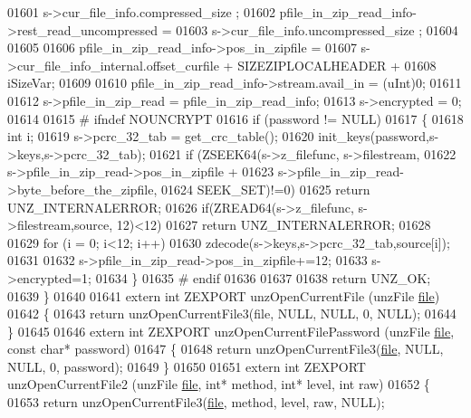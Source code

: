 \begin{DoxyCode}
01601             s->cur\_file\_info.compressed\_size ;
01602     pfile\_in\_zip\_read\_info->rest\_read\_uncompressed =
01603             s->cur\_file\_info.uncompressed\_size ;
01604 
01605 
01606     pfile\_in\_zip\_read\_info->pos\_in\_zipfile =
01607             s->cur\_file\_info\_internal.offset\_curfile + SIZEZIPLOCALHEADER +
01608               iSizeVar;
01609 
01610     pfile\_in\_zip\_read\_info->stream.avail\_in = (uInt)0;
01611 
01612     s->pfile\_in\_zip\_read = pfile\_in\_zip\_read\_info;
01613                 s->encrypted = 0;
01614 
01615 \textcolor{preprocessor}{#    ifndef NOUNCRYPT}
01616     \textcolor{keywordflow}{if} (password != NULL)
01617     \{
01618         \textcolor{keywordtype}{int} i;
01619         s->pcrc\_32\_tab = get\_crc\_table();
01620         init\_keys(password,s->keys,s->pcrc\_32\_tab);
01621         \textcolor{keywordflow}{if} (ZSEEK64(s->z\_filefunc, s->filestream,
01622                   s->pfile\_in\_zip\_read->pos\_in\_zipfile +
01623                      s->pfile\_in\_zip\_read->byte\_before\_the\_zipfile,
01624                   SEEK\_SET)!=0)
01625             \textcolor{keywordflow}{return} UNZ\_INTERNALERROR;
01626         \textcolor{keywordflow}{if}(ZREAD64(s->z\_filefunc, s->filestream,source, 12)<12)
01627             \textcolor{keywordflow}{return} UNZ\_INTERNALERROR;
01628 
01629         \textcolor{keywordflow}{for} (i = 0; i<12; i++)
01630             zdecode(s->keys,s->pcrc\_32\_tab,source[i]);
01631 
01632         s->pfile\_in\_zip\_read->pos\_in\_zipfile+=12;
01633         s->encrypted=1;
01634     \}
01635 \textcolor{preprocessor}{#    endif}
01636 
01637 
01638     \textcolor{keywordflow}{return} UNZ\_OK;
01639 \}
01640 
01641 \textcolor{keyword}{extern} \textcolor{keywordtype}{int} ZEXPORT unzOpenCurrentFile (unzFile \hyperlink{structfile}{file})
01642 \{
01643     \textcolor{keywordflow}{return} unzOpenCurrentFile3(file, NULL, NULL, 0, NULL);
01644 \}
01645 
01646 \textcolor{keyword}{extern} \textcolor{keywordtype}{int} ZEXPORT unzOpenCurrentFilePassword (unzFile \hyperlink{structfile}{file}, \textcolor{keyword}{const} \textcolor{keywordtype}{char}*  password)
01647 \{
01648     \textcolor{keywordflow}{return} unzOpenCurrentFile3(\hyperlink{structfile}{file}, NULL, NULL, 0, password);
01649 \}
01650 
01651 \textcolor{keyword}{extern} \textcolor{keywordtype}{int} ZEXPORT unzOpenCurrentFile2 (unzFile \hyperlink{structfile}{file}, \textcolor{keywordtype}{int}* method, \textcolor{keywordtype}{int}* level, \textcolor{keywordtype}{int} raw)
01652 \{
01653     \textcolor{keywordflow}{return} unzOpenCurrentFile3(\hyperlink{structfile}{file}, method, level, raw, NULL);

\end{DoxyCode}
